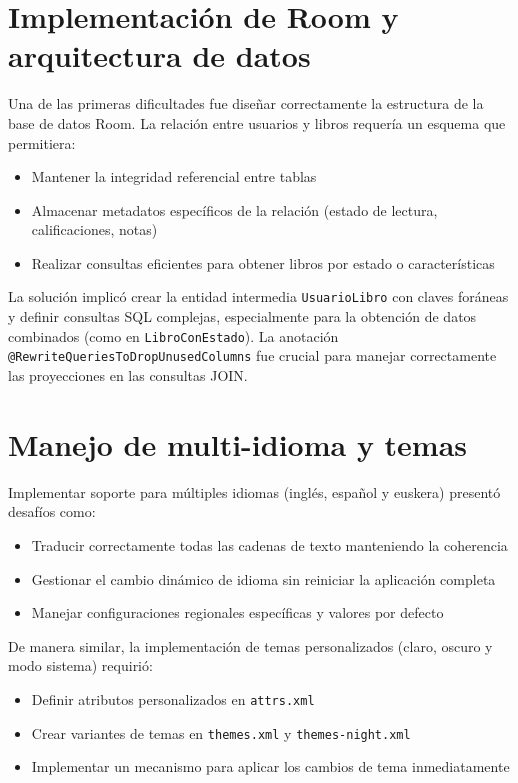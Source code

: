 \documentclass[a4paper,10pt]{report}
\begin{document}
    \section{Implementación de Room y arquitectura de datos}
      Una de las primeras dificultades fue diseñar correctamente la estructura de la base de datos Room\cite{room_documentation}. La relación entre usuarios y libros requería un esquema que permitiera:
      \begin{itemize}
          \item Mantener la integridad referencial entre tablas
          \item Almacenar metadatos específicos de la relación (estado de lectura, calificaciones, notas)
          \item Realizar consultas eficientes para obtener libros por estado o características
      \end{itemize}

      La solución implicó crear la entidad intermedia \texttt{UsuarioLibro} con claves foráneas y definir consultas SQL complejas, especialmente para la obtención de datos combinados (como en \texttt{LibroConEstado}). La anotación \texttt{@RewriteQueriesToDropUnusedColumns} fue crucial para manejar correctamente las proyecciones en las consultas JOIN.

    \section{Manejo de multi-idioma y temas}
      Implementar soporte para múltiples idiomas (inglés, español y euskera) presentó desafíos como\cite{android_localization}:
      \begin{itemize}
          \item Traducir correctamente todas las cadenas de texto manteniendo la coherencia
          \item Gestionar el cambio dinámico de idioma sin reiniciar la aplicación completa
          \item Manejar configuraciones regionales específicas y valores por defecto
      \end{itemize}
      
      De manera similar, la implementación de temas personalizados (claro, oscuro y modo sistema) requirió\cite{androidUIUX}:
      \begin{itemize}
          \item Definir atributos personalizados en \texttt{attrs.xml}
          \item Crear variantes de temas en \texttt{themes.xml} y \texttt{themes-night.xml}
          \item Implementar un mecanismo para aplicar los cambios de tema inmediatamente
      \end{itemize}
      
\end{document}
